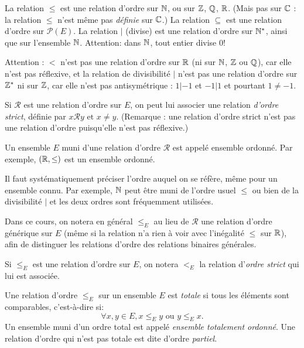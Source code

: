 \begin{exemples}
La relation $\leq$ est une relation d'ordre sur $\mathbb{N}$, ou sur $\mathbb{Z}$, $\mathbb{Q}$, $\mathbb{R}$. (Mais pas sur $\mathbb{C}$ : la relation $\leq$ n'est même pas \emph{définie} sur $\mathbb{C}$.)
La relation $\subseteq$ est une relation d'ordre sur $\mathcal P(E)$.
La relation $|$ (\og divise\fg) est une relation d'ordre sur $\mathbb{N}^*$, ainsi que sur l'ensemble $\mathbb{N}$. Attention: dans $\mathbb{N}$, tout entier divise $0$! 
\end{exemples}

Attention : $<$ n'est pas une relation d'ordre sur $\mathbb{R}$ (ni sur $\mathbb{N}$, $\mathbb{Z}$ ou $\mathbb{Q}$), car elle n'est pas réflexive, et la relation de divisibilité $|$ n'est pas une relation d'ordre sur $\mathbb{Z}^*$ ni sur $\mathbb{Z}$, car elle n'est pas antisymétrique : $1|-1$ et $-1|1$ et pourtant $1\neq -1$.

\begin{definition}
Si ${\mathcal R}$ est une relation d'ordre sur $E$, on peut lui associer une relation \emph{d'ordre strict}, définie par \og$ x{\mathcal R}y\text{ et }x\neq y$\fg. (Remarque : une relation d'ordre strict n'est pas une relation d'ordre puisqu'elle n'est pas réflexive.)
\end{definition}

Un ensemble $E$ muni d'une relation d'ordre ${\mathcal R}$ est appelé ensemble ordonné. Par exemple, $(\mathbb{R}, \leq)$ est un ensemble ordonné.

Il faut systématiquement préciser l'ordre auquel on se réfère, même pour un ensemble \og connu\fg. Par exemple, $\mathbb{N}$ peut être muni de l'ordre usuel $\leq$ ou bien de la divisibilité $|$ et les deux ordres sont fréquemment utilisées.

Dans ce cours, on notera en général $\leq_E$ au lieu de ${\mathcal R}$ une relation d'ordre générique sur $E$ (même si la relation n'a rien à voir avec l'inégalité $\leq$ sur $\mathbb{R}$), afin de distinguer les relations d'ordre des relations binaires générales.

Si $\leq_E$ est une relation d'ordre sur $E$, on notera $<_E$ la relation d'\emph{ordre strict} qui lui est associée.

\begin{definition}
Une relation d'ordre $\leq_E$ sur un ensemble $E$ est \emph{totale} si tous les éléments sont comparables, c'est-à-dire si:
\[ \forall x, y\in E, x\leq_Ey\text{ ou } y\leq_E x.\]
Un ensemble muni d'un ordre total est appelé \emph{ensemble totalement ordonné}. Une relation d'ordre qui n'est pas totale est dite d'ordre \emph{partiel}.
\end{definition}

